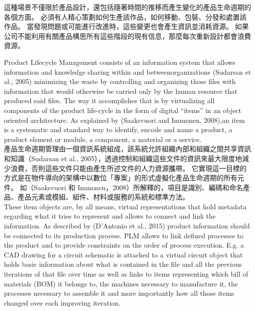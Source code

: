 \fontsize{14pt}{5pt}\sectionef
 {這種場景不僅限於產品設計，還包括隨著時間的推移而產生變化的產品生命週期的各個方面。 必須有人精心策劃如何生產該作品，如何移動、包裝、分發和處置該作品。 當發現問題或可能進行改進時，這些變更也會產生資訊並消耗資源。 如果公司不能利用有關產品構思所有這些階段的現有信息，那麼每次重新設計都會浪費資源。}\\[15pt]
\newpage

\fontsize{14pt}{2.5pt}\sectionef 
{Product Lifecycle Management consists of an information system that allows information and knowledge sharing within and betweenorganizations (Sudarsan et al., 2005) minimizing the waste by controlling and organizing those files with information that would otherwise be carried only by the human resource that produced said files. The way it accomplishes that is by virtualizing all components of the product life-cycle in the form of digital “items” in an object oriented architecture. As explained by (Saaksvuori and Immonen, 2008),an item is a systematic and standard way to identify, encode and name a product, a product element or module, a component, a material or a service.
}\\[1pt]

\fontsize{14pt}{5pt}\sectionef
 {產品生命週期管理由一個資訊系統組成，該系統允許組織內部和組織之間共享資訊和知識（Sudarsan et al., 2005），透過控制和組織這些文件的資訊來最大限度地減少浪費，否則這些文件只能由產生所述文件的人力資源攜帶。 它實現這一目標的方式是在物件導向的架構中以數位「專案」的形式虛擬化產品生命週期的所有元件。 如（Saaksvuori 和 Immonen，2008）所解釋的，項目是識別、編碼和命名產品、產品元素或模組、組件、材料或服務的系統和標準方法。}\\[15pt]


\fontsize{14pt}{2.5pt}\sectionef 
{These item objects are, by all means, virtual representations that hold metadata regarding what it tries to represent and allows to connect and link the information. As described by (D’Antonio et al., 2015) product information should be connected to its production process. PLM allows to link defined processes to the product and to provide constraints on the order of process execution. E.g. a CAD drawing for a circuit schematic is attached to a virtual circuit object that holds basic information about what is contained in the file and all the previous iterations of that file over time as well as links to items representing which bill of materials (BOM) it belongs to, the machines necessary to manufacture it, the processes necessary to assemble it and more importantly how all those items changed over each improving iteration.
}\\[1pt]

